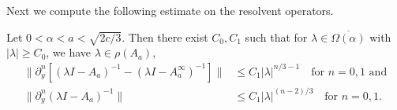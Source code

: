 Next we compute the following estimate on the resolvent operators.

\begin{prop}[c.f.\ Lemma 4.4]\label{difference-of-resolvents-estimate}
	Let \(0<\alpha<a< \sqrt{2c/3}\). Then there exist \(C_0,C_1\) such that for \(\lambda\in\overline{\Omega(\alpha)}\) with \(|\lambda| \geq C_0\), we have \(\lambda\in\rho(A_a)\),
	\begin{align}
		\|\partial_y^n [(\lambda I -A_a)^{-1} - (\lambda I - A_a^\infty)^{-1}] \| &\leq C_1 |\lambda|^{n/3 - 1} \quad \text{for } n=0,1 \text{ and} \\
		\|\partial_y^n(\lambda I - A_a)^{-1} \| &\leq C_1 |\lambda|^{(n-2)/3} \quad \text{for } n=0,1. \label{derivative-A_a-resolvent}
	\end{align}
\end{prop}
